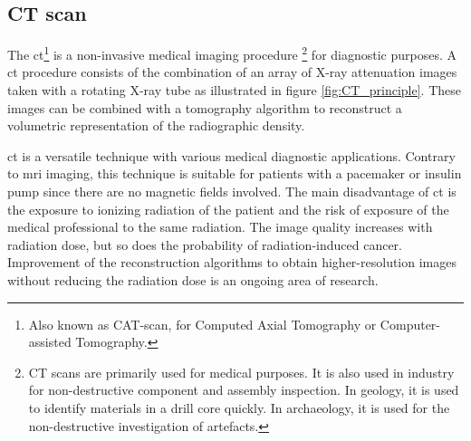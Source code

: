 \subsection{CT scan}
\par{
    The \acrfull{ct}\footnote{Also known as CAT-scan, for Computed Axial Tomography or Computer-assisted Tomography.} is a non-invasive medical imaging procedure
    \footnote{CT scans are primarily used for medical purposes. 
    It is also used in industry for non-destructive component and assembly inspection.
    In geology, it is used to identify materials in a drill core quickly. In archaeology, it is used for the non-destructive investigation of artefacts. } 
    for diagnostic purposes. 
    A \acrlong{ct} procedure consists of the combination of an array of X-ray attenuation images taken with a rotating X-ray tube as illustrated in figure \ref{fig:CT_principle}. 
    These images can be combined with a tomography algorithm to reconstruct a volumetric representation of the radiographic density.
}
\par{
    \acrshort{ct} is a versatile technique with various medical diagnostic applications. 
    Contrary to \acrfull{mri} imaging, this technique is suitable for patients with a pacemaker or insulin pump since there are no magnetic fields involved.
    The main disadvantage of \acrshort{ct} is the exposure to ionizing radiation of the patient and the risk of exposure of the medical professional to the same radiation.
    The image quality increases with radiation dose, but so does the probability of radiation-induced cancer.
    Improvement of the reconstruction algorithms to obtain higher-resolution images without reducing the radiation dose is an ongoing area of research. 
}

